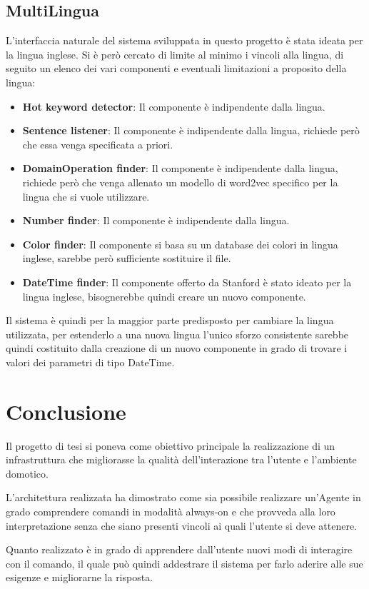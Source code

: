 \documentclass[twoside]{supsistudent}
\begin{document}
\section{MultiLingua}
L'interfaccia naturale del sistema sviluppata in questo progetto è stata ideata per la lingua inglese. Si è però cercato di limite al minimo i vincoli alla lingua, di seguito un elenco dei vari componenti e eventuali limitazioni a proposito della lingua:
\begin{itemize}
      \item \textbf{Hot keyword detector}: Il componente è indipendente dalla lingua.
      \item \textbf{Sentence listener}: Il componente è indipendente dalla lingua, richiede però che essa venga specificata a priori.
      \item \textbf{DomainOperation finder}: Il componente è indipendente dalla lingua, richiede però che venga allenato un modello di word2vec specifico per la lingua che si vuole utilizzare.
      \item \textbf{Number finder}: Il componente è indipendente dalla lingua.
      \item \textbf{Color finder}: Il componente si basa su un database dei colori in lingua inglese, sarebbe però sufficiente sostituire il file.
      \item \textbf{DateTime finder}: Il componente offerto da Stanford è stato ideato per la lingua inglese, bisognerebbe quindi creare un nuovo componente.
\end{itemize}
Il sistema è quindi per la maggior parte predisposto per cambiare la lingua utilizzata, per estenderlo a una nuova lingua l'unico sforzo consistente sarebbe quindi costituito dalla creazione di un nuovo componente in grado di trovare i valori dei parametri di tipo DateTime.
\chapter{Conclusione}
Il progetto di tesi si poneva come obiettivo principale la realizzazione di un infrastruttura che migliorasse la qualità dell'interazione tra l'utente e l'ambiente domotico.

L'architettura realizzata ha dimostrato come sia possibile realizzare un'Agente in grado comprendere comandi in modalità always-on e che provveda alla loro interpretazione senza che siano presenti vincoli ai quali l'utente si deve attenere.

Quanto realizzato è in grado di apprendere dall'utente nuovi modi di interagire con il comando, il quale può quindi addestrare il sistema per farlo aderire alle sue esigenze e migliorarne la risposta.
\end{document}
